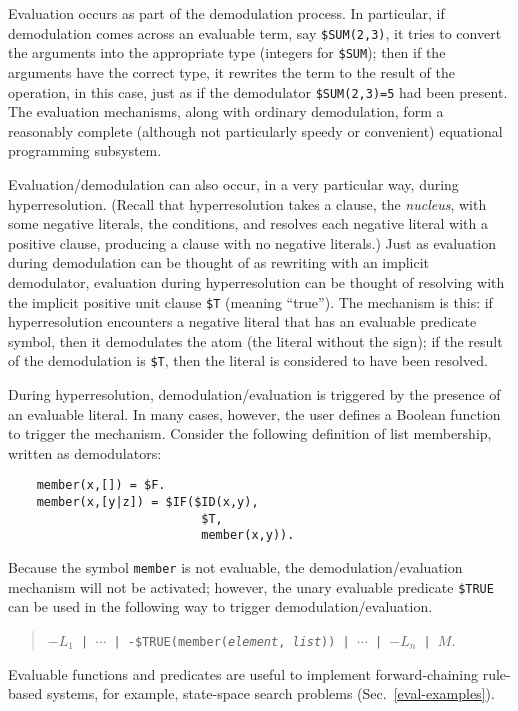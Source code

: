 \documentclass[11pt]{article}
\begin{document}
Evaluation occurs as part of the demodulation process.  In
particular, if demodulation comes across an evaluable term, say
\verb:$SUM(2,3):, it tries to convert the arguments into the
appropriate type (integers for \verb:$SUM:); then if the arguments have the
correct type, it rewrites the term to the result of the operation, in
this case, just as if the demodulator \verb:$SUM(2,3)=5: had been
present.
The evaluation mechanisms, along with ordinary demodulation, form a
reasonably complete (although not particularly speedy or convenient)
equational programming subsystem.

Evaluation/demodulation can also occur, in a very particular way,
during hyperresolution.  (Recall that hyperresolution takes a clause,
the {\em nucleus}, with some negative literals, the conditions, and
resolves each negative literal with a positive clause, producing a
clause with no negative literals.)  Just as evaluation during
demodulation can be thought of as rewriting with an implicit
demodulator, evaluation during hyperresolution can be thought of
resolving with the implicit positive unit clause \verb:$T:
(meaning ``true'').  The mechanism is this: if hyperresolution encounters a
negative literal that has an evaluable predicate symbol, then it
demodulates the atom (the literal without the sign); if the result of
the demodulation is \verb:$T:,
then the literal is considered to have been resolved.

During hyperresolution, demodulation/evaluation is triggered by the
presence of an evaluable literal.  In many cases, however, the user
defines a Boolean function to trigger the mechanism.
Consider the following definition of list membership, written as demodulators:

{\small
\begin{verbatim}
    member(x,[]) = $F.
    member(x,[y|z]) = $IF($ID(x,y),
                           $T,
                           member(x,y)).
\end{verbatim}
}
\noindent
Because the symbol \verb:member: is not evaluable, the
demodulation/evaluation mechanism will not be activated;
however, the unary evaluable predicate \verb:$TRUE:
 can be used in the following way to trigger demodulation/evaluation.
\begin{verse} \small
{\tt $-L_1$ | $\cdots$ | -\$TRUE(member({\it element}, {\it list})) | $\cdots$ | $-L_n$ | $M$}.
\end{verse}
Evaluable functions and predicates are useful to implement
forward-chaining rule-based systems, for example, state-space search
problems (Sec.~\ref{eval-examples}).
\end{document}
